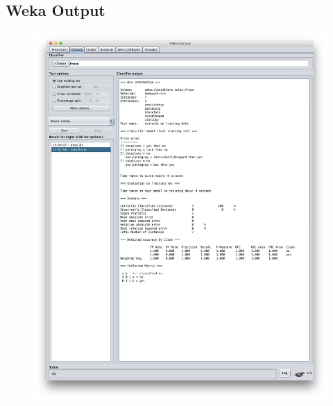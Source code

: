\documentclass[12pt]{scrartcl}
\begin{document}
\subsection{Weka Output}
\begin{figure}[H]
    \centering
    \includegraphics[width=.75\linewidth]{assets/problem-6.png}
    \label{fig:assets/homework-1-6}
\end{figure}
\end{document}
